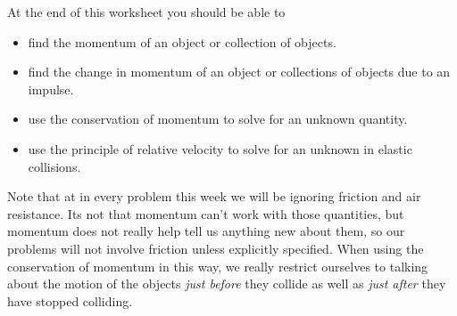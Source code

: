 \documentclass[letterpaper,12pt]{article}
\title{\class}
\author{\examnum}
\date{\examdate}
\let\olditem\item
\renewcommand{\item}{\Needspace{6\baselineskip}\olditem}
\begin{document}
	
At the end of this worksheet you should be able to  
\begin{itemize}
	\item find the momentum of an object or collection of objects.
	\item find the change in momentum of an object or collections of objects due to an impulse.
	\item use the conservation of momentum to solve for an unknown quantity.
	\item use the principle of relative velocity to solve for an unknown in elastic collisions.
\end{itemize}

Note that at in every problem this week we will be ignoring friction and air resistance. Its not that momentum can't work with those quantities, but momentum does not really help tell us anything new about them, so our problems will not involve friction unless explicitly specified. When using the conservation of momentum in this way, we really restrict ourselves to talking about the motion of the objects \emph{just before} they collide as well as \emph{just after} they have stopped colliding.
\end{document}
